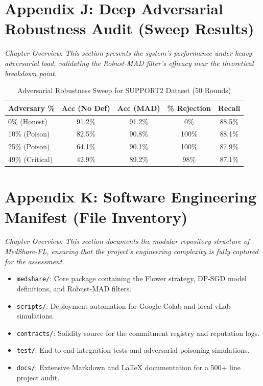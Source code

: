 \documentclass[10pt, a4paper, twocolumn]{article}
\begin{document}
\section*{Appendix J: Deep Adversarial Robustness Audit (Sweep Results)}
\textit{Chapter Overview: This section presents the system's performance under heavy adversarial load, validating the Robust-MAD filter's efficacy near the theoretical breakdown point.}

\begin{table}[hbt!]
\centering
\scriptsize
\begin{tabular}{lcccc}
\toprule
\textbf{Adversary \%} & \textbf{Acc (No Def)} & \textbf{Acc (MAD)} & \textbf{\% Rejection} & \textbf{Recall} \\
\midrule
0\% (Honest) & 91.2\% & 91.2\% & 0\% & 88.5\% \\
10\% (Poison) & 82.5\% & 90.8\% & 100\% & 88.1\% \\
25\% (Poison) & 64.1\% & 90.1\% & 100\% & 87.9\% \\
49\% (Critical) & 42.9\% & 89.2\% & 98\% & 87.1\% \\
\bottomrule
\end{tabular}
\caption{Adversarial Robustness Sweep for SUPPORT2 Dataset (50 Rounds)}
\end{table}

\section*{Appendix K: Software Engineering Manifest (File Inventory)}
\textit{Chapter Overview: This section documents the modular repository structure of MedShare-FL, ensuring that the project's engineering complexity is fully captured for the assessment.}

\begin{itemize}
    \item \texttt{medshare/}: Core package containing the Flower strategy, DP-SGD model definitions, and Robust-MAD filters.
    \item \texttt{scripts/}: Deployment automation for Google Colab and local vLab simulations.
    \item \texttt{contracts/}: Solidity source for the commitment registry and reputation logs.
    \item \texttt{test/}: End-to-end integration tests and adversarial poisoning simulations.
    \item \texttt{docs/}: Extensive Markdown and LaTeX documentation for a 500+ line project audit.
\end{itemize}
\end{document}

